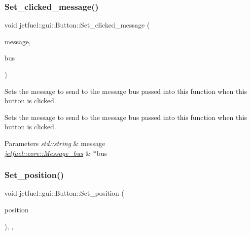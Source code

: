 \subsubsection{\texorpdfstring{Set\+\_\+clicked\+\_\+message()}{Set\_clicked\_message()}}
{\footnotesize\ttfamily void jetfuel\+::gui\+::\+Button\+::\+Set\+\_\+clicked\+\_\+message (\begin{DoxyParamCaption}\item[{const std\+::string}]{message,  }\item[{\hyperlink{classjetfuel_1_1core_1_1Message__bus}{jetfuel\+::core\+::\+Message\+\_\+bus} $\ast$}]{bus }\end{DoxyParamCaption})\hspace{0.3cm}{\ttfamily [inline]}}



Sets the message to send to the message bus passed into this function when this button is clicked. 

Sets the message to send to the message bus passed into this function when this button is clicked.


\begin{DoxyParams}{Parameters}
{\em std\+::string} & message \\
\hline
{\em \hyperlink{classjetfuel_1_1core_1_1Message__bus}{jetfuel\+::core\+::\+Message\+\_\+bus}} & $\ast$bus \\
\hline
\end{DoxyParams}
\mbox{\label{classjetfuel_1_1gui_1_1Button_a642d3f1412339c826458b80dce76ef34}} 
\subsubsection{\texorpdfstring{Set\+\_\+position()}{Set\_position()}}
{\footnotesize\ttfamily void jetfuel\+::gui\+::\+Button\+::\+Set\+\_\+position (\begin{DoxyParamCaption}\item[{\hyperlink{classjetfuel_1_1draw_1_1Vector2d}{jetfuel\+::draw\+::\+Vector2d\+\_\+int}}]{position }\end{DoxyParamCaption})\hspace{0.3cm}{\ttfamily [inline]}, {\ttfamily [override]}, {\ttfamily [virtual]}}



